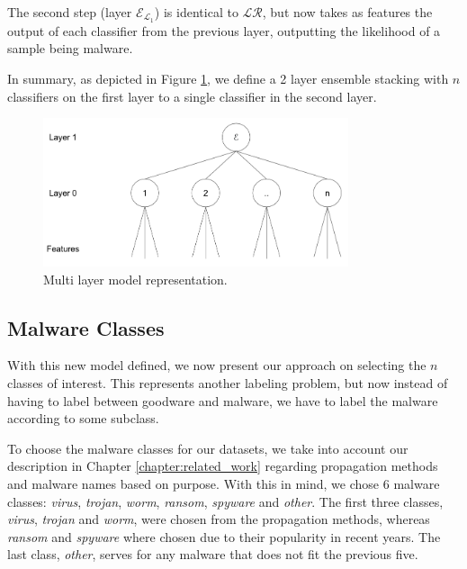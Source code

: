 The second step (layer $\mathcal{E}_{\mathcal{L}_{1}}$) is identical to $\mathcal{LR}$, but now takes as features the output of each classifier from the previous layer, outputting the likelihood of a sample being malware.

In summary, as depicted in Figure \ref{fig:dia_multilayer}, we define a 2 layer ensemble stacking with $n$ classifiers on the first layer to a single classifier in the second layer.

\begin{figure}[!htb]
	\centering
	\includegraphics[width=0.8\textwidth]{Figures/dia_multilayer.png}
	\caption{Multi layer model representation.}
	\label{fig:dia_multilayer}
\end{figure}

\subsection{Malware Classes}

With this new model defined, we now present our approach on selecting the $n$ classes of interest.
This represents another labeling problem, but now instead of having to label between goodware and malware, we have to label the malware according to some subclass.

To choose the malware classes for our datasets, we take into account our description in Chapter \ref{chapter:related_work} regarding propagation methods and malware names based on purpose.
With this in mind, we chose 6 malware classes: \textit{virus}, \textit{trojan}, \textit{worm}, \textit{ransom}, \textit{spyware} and \textit{other}.
The first three classes, \textit{virus}, \textit{trojan} and \textit{worm}, were chosen from the propagation methods, whereas \textit{ransom} and \textit{spyware}
where chosen due to their popularity in recent years. The last class, \textit{other}, serves for any malware that does not fit the previous five.

